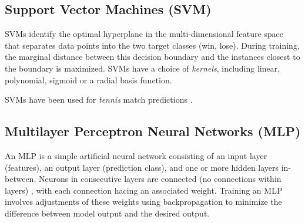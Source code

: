 \subsection{Support Vector Machines (SVM)}
SVMs identify the optimal hyperplane in the multi-dimensional feature space that separates data points into the two target classes (win, lose). During training, the marginal distance between this decision boundary and the instances closest to the boundary is maximized. %
SVMs have a choice of \textit{kernels}, including linear, polynomial, sigmoid or a radial basis function.

SVMs have been used for  \textit{tennis} match predictions \cite{cornman2017machine}.

\subsection{Multilayer Perceptron Neural Networks (MLP)}
An MLP is a simple artificial neural network consisting of an input layer (features), an output layer (prediction class), and  one or more hidden layers in-between. Neurons in consecutive layers are connected (no connections within layers) \cite{noriega2005multilayer}, with each connection hacing an associated weight. Training an MLP involves adjustments of these weights using backpropagation to minimize the difference between model output and the desired output.

